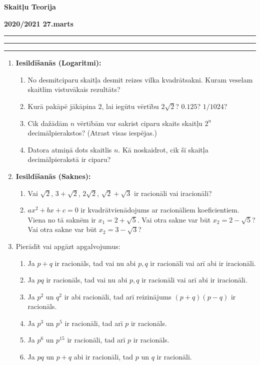 \documentclass[a4paper,12pt]{article}
\begin{document}
\renewcommand\arraystretch{1.5}

\begin{center}
\parbox{3cm}{\flushleft\bf Skaitļu Teorija}
\hfill
\parbox{7cm}{}
\hfill
\parbox{3cm}{\flushright\bf 2020/2021 \linebreak 27.marts}
\end{center}

\hrule\vspace{2pt}\hrule

\hrule

\begin{enumerate}


\item \textbf{Iesildīšanās (Logaritmi):} 
\begin{enumerate}
\item No desmitciparu skaitļa desmit reizes vilka kvadrātsakni. Kuram veselam skaitlim vistuvākais rezultāts?
\item Kurā pakāpē jākāpina $2$, lai iegūtu vērtību $2\sqrt{2}$? $0.125$? $1/1024$?
\item Cik dažādām $n$ vērtībām var sakrist ciparu skaits skaitļu $2^n$ decimālpierakstos? (Atrast visas iespējas.)
\item Datora atmiņā dots skaitlis $n$. Kā noskaidrot, cik šī skaitļa decimālpierakstā ir ciparu?
\end{enumerate}


\item \textbf{Iesildīšanās (Saknes):}
\begin{enumerate}
\item Vai $\sqrt{2}$, $3 + \sqrt{2}$, $2\sqrt{2}$, $\sqrt{2} + \sqrt{3}$ ir racionāli vai iracionāli?
\item $ax^2 + bx + c = 0$ ir kvadrātvienādojums ar racionāliem koeficientiem. Viena no tā saknēm 
ir $x_1 = 2 + \sqrt{5}$. Vai otra sakne var būt $x_2 = 2 - \sqrt{5}$? Vai otra sakne var būt $x_2 = 3 - \sqrt{3}$? 
\end{enumerate}

\item Pierādīt vai apgāzt apgalvojumus:
\begin{enumerate}
\item Ja $p + q$ ir racionāls, tad vai nu abi $p,q$ ir racionāli vai arī abi ir iracionāli.
\item Ja $pq$ ir racionāls, tad vai nu abi $p,q$ ir racionāli vai arī abi ir iracionāli.
\item Ja $p^2$ un $q^2$ ir abi racionāli, tad arī reizinājums  $(p+q)(p-q)$ ir racionāls.
\item Ja $p^3$ un $p^5$ ir racionāli, tad arī $p$ ir racionāls.
\item Ja $p^6$ un $p^{15}$ ir racionāli, tad arī $p$ ir racionāls.
\item Ja $pq$ un $p+q$ abi ir racionāli, tad $p$ un $q$ ir racionāli.
\end{enumerate}




\end{enumerate}
\end{document}
